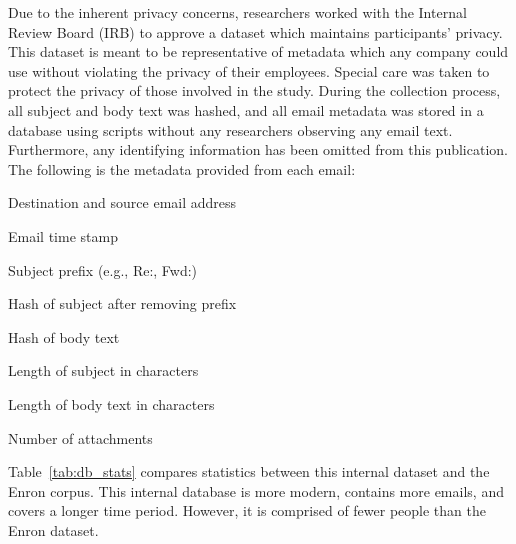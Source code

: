 \documentclass[10pt,twocolumn,conference]{IEEEtran}
\begin{document}
Due to the inherent privacy concerns, researchers worked with the Internal Review Board (IRB) to approve a dataset which maintains participants' privacy.  This dataset is meant to be representative of metadata which any company could use without violating the privacy of their employees.  Special care was taken to protect the privacy of those involved in the study.  During the collection process, all subject and body text was hashed, and all email metadata was stored in a database using scripts without any researchers observing any email text. Furthermore, any identifying information has been omitted from this publication.
The following is the metadata provided from each email:
\begin{compactitem}
\item Destination and source email address
\item Email time stamp
\item Subject prefix (e.g., Re:, Fwd:)
\item Hash of subject after removing prefix
\item Hash of body text
\item Length of subject in characters
\item Length of body text in characters
\item Number of attachments
\end{compactitem}

\begin{table}[t]
\centering
\caption{A comparison between the internal dataset and the Enron email corpus.}
\label{tab:db_stats}
\end{table}


Table~\ref{tab:db_stats} compares statistics between this internal dataset and the Enron corpus.  This internal database is more modern, contains more emails, and covers a longer time period.  However, it is comprised of fewer people than the Enron dataset.
\end{document}
